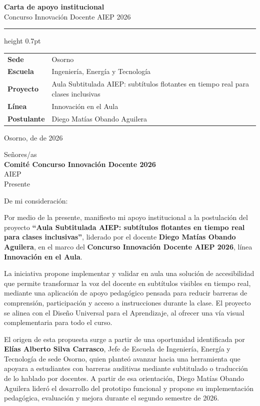 \documentclass[10pt,letterpaper]{article}
\newcommand{\blankline}[1]{\makebox[#1]{\hrulefill}}
\begin{document}
{\large\bfseries Carta de apoyo institucional}\\[-0.25em]
{\small Concurso Innovación Docente AIEP 2026}

\vspace{0.12em}
\hrule height 0.7pt
\vspace{0.45em}

\begin{tabularx}{\textwidth}{>{\bfseries}p{3.45cm}X}
Sede & Osorno \\
Escuela & Ingeniería, Energía y Tecnología \\
Proyecto & Aula Subtitulada AIEP: subtítulos flotantes en tiempo real para clases inclusivas \\
Línea & Innovación en el Aula \\
Postulante & Diego Matías Obando Aguilera \\
\end{tabularx}

\vspace{0.35em}

Osorno, \blankline{2.0cm} de \blankline{3.0cm} de 2026

\vspace{0.2em}

Señores/as\\
\textbf{Comité Concurso Innovación Docente 2026}\\
AIEP\\
Presente

\vspace{0.2em}

De mi consideración:

Por medio de la presente, manifiesto mi apoyo institucional a la postulación del proyecto \textbf{``Aula Subtitulada AIEP: subtítulos flotantes en tiempo real para clases inclusivas''}, liderado por el docente \textbf{Diego Matías Obando Aguilera}, en el marco del \textbf{Concurso Innovación Docente AIEP 2026}, línea \textbf{Innovación en el Aula}.

La iniciativa propone implementar y validar en aula una solución de accesibilidad que permite transformar la voz del docente en subtítulos visibles en tiempo real, mediante una aplicación de apoyo pedagógico pensada para reducir barreras de comprensión, participación y acceso a instrucciones durante la clase. El proyecto se alinea con el Diseño Universal para el Aprendizaje, al ofrecer una vía visual complementaria para todo el curso.

El origen de esta propuesta surge a partir de una oportunidad identificada por \textbf{Elías Alberto Silva Carrasco}, Jefe de Escuela de Ingeniería, Energía y Tecnología de sede Osorno, quien planteó avanzar hacia una herramienta que apoyara a estudiantes con barreras auditivas mediante subtitulado o traducción de lo hablado por docentes. A partir de esa orientación, Diego Matías Obando Aguilera lideró el desarrollo del prototipo funcional y propone su implementación pedagógica, evaluación y mejora durante el segundo semestre de 2026.
\end{document}
